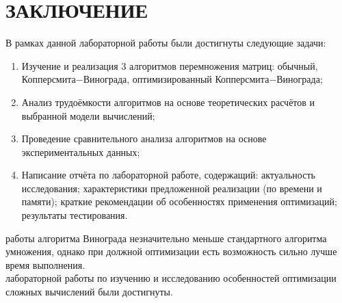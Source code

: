 \chapter*{ЗАКЛЮЧЕНИЕ}

В рамках данной лабораторной работы были достигнуты следующие задачи:

\begin{enumerate}
    \item Изучение и реализация 3 алгоритмов перемножения матриц: обычный, Копперсмита$-$Винограда, оптимизированный Копперсмита$-$Винограда;
    \item Анализ трудоёмкости алгоритмов на основе теоретических расчётов и выбранной модели вычислений;
    \item Проведение сравнительного анализа алгоритмов на основе экспериментальных данных;
    \item Написание отчёта по лабораторной работе, содержащий: актуальность исследования; характеристики предложенной реализации (по времени и памяти);
    краткие рекомендации об особенностях применения оптимизаций;
    результаты тестирования.
\end{enumerate}
\indent{} работы алгоритма Винограда незначительно меньше стандартного алгоритма умножения, однако при должной оптимизации есть возможность сильно лучше время выполнения.
\\
 лабораторной работы по изучению и исследованию особенностей оптимизации сложных вычислений были достигнуты.